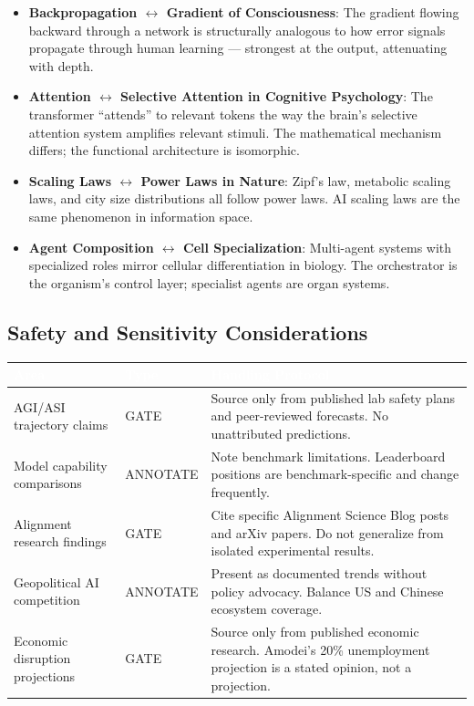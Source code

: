 \documentclass[11pt,letterpaper]{article}
\newcommand{\tableheader}[1]{\textbf{\sffamily\textcolor{white}{#1}}}
\begin{document}
\begin{itemize}[leftmargin=*]
\item \textbf{Backpropagation $\leftrightarrow$ Gradient of Consciousness}: The gradient flowing backward through a network is structurally analogous to how error signals propagate through human learning --- strongest at the output, attenuating with depth.
\item \textbf{Attention $\leftrightarrow$ Selective Attention in Cognitive Psychology}: The transformer ``attends'' to relevant tokens the way the brain's selective attention system amplifies relevant stimuli. The mathematical mechanism differs; the functional architecture is isomorphic.
\item \textbf{Scaling Laws $\leftrightarrow$ Power Laws in Nature}: Zipf's law, metabolic scaling laws, and city size distributions all follow power laws. AI scaling laws are the same phenomenon in information space.
\item \textbf{Agent Composition $\leftrightarrow$ Cell Specialization}: Multi-agent systems with specialized roles mirror cellular differentiation in biology. The orchestrator is the organism's control layer; specialist agents are organ systems.
\end{itemize}

\subsection{Safety and Sensitivity Considerations}

\begin{center}
\begin{tabularx}{\textwidth}{L{3.5cm}L{2cm}X}
\toprule
{}
\tableheader{Area} & \tableheader{Type} & \tableheader{Handling Protocol} \\
\midrule
AGI/ASI trajectory claims & GATE & Source only from published lab safety plans and peer-reviewed forecasts. No unattributed predictions. \\
Model capability comparisons & ANNOTATE & Note benchmark limitations. Leaderboard positions are benchmark-specific and change frequently. \\
Alignment research findings & GATE & Cite specific Alignment Science Blog posts and arXiv papers. Do not generalize from isolated experimental results. \\
Geopolitical AI competition & ANNOTATE & Present as documented trends without policy advocacy. Balance US and Chinese ecosystem coverage. \\
Economic disruption projections & GATE & Source only from published economic research. Amodei's 20\% unemployment projection is a stated opinion, not a projection. \\
\bottomrule
\end{tabularx}
\end{center}
\end{document}
